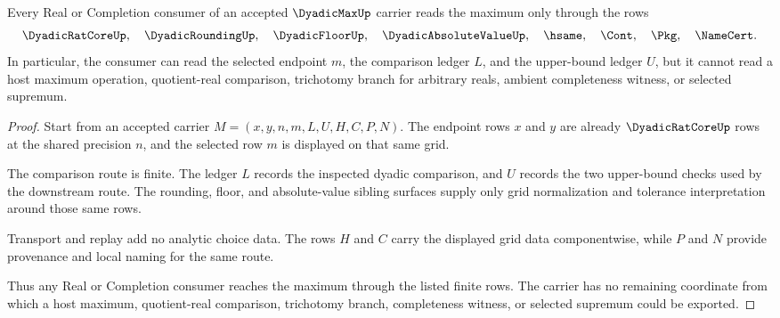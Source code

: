 \begin{theorem}
\label{thm:dyadic-max-grid-boundary}
Every Real or Completion consumer of an accepted $\DyadicMaxUp$ carrier reads the maximum only through the rows
$$
\DyadicRatCoreUp,\quad \DyadicRoundingUp,\quad \DyadicFloorUp,\quad \DyadicAbsoluteValueUp,\quad \hsame,\quad \Cont,\quad \Pkg,\quad \NameCert .
$$
In particular, the consumer can read the selected endpoint $m$, the comparison ledger $L$, and the upper-bound ledger $U$, but it cannot read a host maximum operation, quotient-real comparison, trichotomy branch for arbitrary reals, ambient completeness witness, or selected supremum.
\end{theorem}
\begin{proof}
Start from an accepted carrier $M=(x,y,n,m,L,U,H,C,P,N)$. The endpoint rows $x$ and $y$ are already $\DyadicRatCoreUp$ rows at the shared precision $n$, and the selected row $m$ is displayed on that same grid.

The comparison route is finite. The ledger $L$ records the inspected dyadic comparison, and $U$ records the two upper-bound checks used by the downstream route. The rounding, floor, and absolute-value sibling surfaces supply only grid normalization and tolerance interpretation around those same rows.

Transport and replay add no analytic choice data. The rows $H$ and $C$ carry the displayed grid data componentwise, while $P$ and $N$ provide provenance and local naming for the same route.

Thus any Real or Completion consumer reaches the maximum through the listed finite rows. The carrier has no remaining coordinate from which a host maximum, quotient-real comparison, trichotomy branch, completeness witness, or selected supremum could be exported.
\end{proof}



